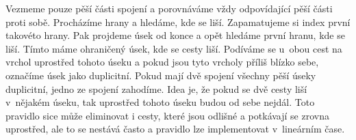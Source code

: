 Vezmeme pouze pěší části spojení a porovnáváme vždy
odpovídající pěší části proti sobě. Procházíme hrany a hledáme, kde se liší.
Zapamatujeme si index první takovéto hrany. Pak projdeme úsek od konce a opět
hledáme první hranu, kde se liší. Tímto máme ohraničený úsek, kde se cesty liší.
Podíváme se u~obou cest na vrchol uprostřed tohoto úseku a pokud jsou tyto
vrcholy příliš blízko sebe, označíme úsek jako duplicitní. Pokud mají dvě
spojení všechny pěší úseky duplicitní, jedno ze spojení zahodíme. Idea je, že
pokud se dvě cesty liší v~nějakém úseku, tak uprostřed tohoto úseku budou od
sebe nejdál. Toto pravidlo sice může eliminovat i cesty, které jsou odlišné a
potkávají se zrovna uprostřed, ale to se nestává často a pravidlo lze
implementovat v~lineárním čase.
